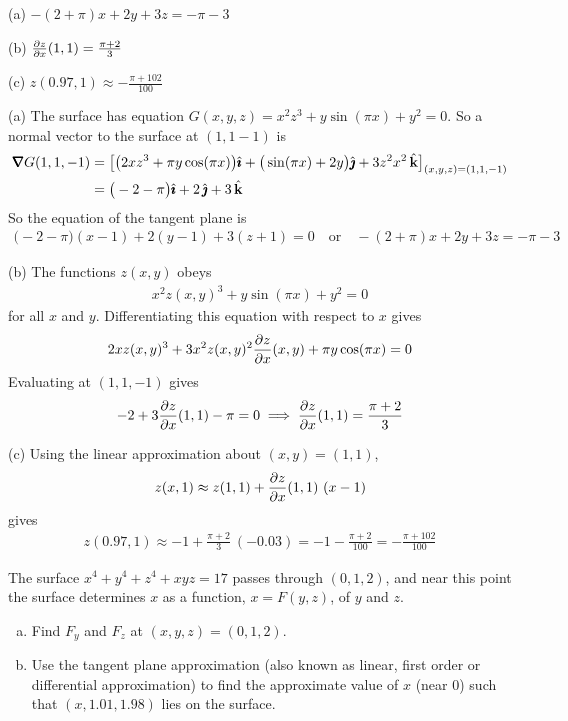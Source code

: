 %

\begin{answer}
(a)  $-(2+\pi)x +2y +3z = -\pi-3$

(b)  $\pdiff{z}{x}(1,1) = \frac{\pi+2}{3}$

(c)  $z(0.97,1) \approx -\frac{\pi+102}{100}$
\end{answer}

\begin{solution}
(a) The surface has equation $G(x,y,z) = x^2 z^3 + y \sin(\pi x) + y^2 =0$.
So a normal vector to the surface at $(1,1-1)$ is
\begin{align*}
\vnabla G(1,1,-1) 
&= \big[ \big(2x z^3 +\pi y\cos(\pi x)\big)\hi +\big(\sin(\pi x) +2y\big)\hj
           +3z^2 x^2\,\hk\big]_{(x,y,z)=(1,1,-1)} \\
&= \big(-2-\pi\big)\hi +2\,\hj +3\,\hk
\end{align*}
So the equation of the tangent plane is
\begin{align*}
\big(-2-\pi\big)(x-1) + 2(y-1) +3 (z+1) =0\quad\text{or}\quad
-(2+\pi)x +2y +3z = -\pi-3
\end{align*}


(b) The functions $z(x,y)$ obeys
\begin{align*}
x^2 z(x,y)^3 +y\sin(\pi x) +y^2 = 0
\end{align*}
for all $x$ and $y$. Differentiating this equation with respect to $x$ gives
\begin{align*}
2x z(x,y)^3 + 3 x^2 z(x,y)^2 \pdiff{z}{x}(x,y) + \pi y \cos(\pi x) =0
\end{align*}
Evaluating at $(1,1,-1)$ gives
\begin{align*}
-2 + 3 \pdiff{z}{x}(1,1) -\pi =0
\implies \pdiff{z}{x}(1,1) = \frac{\pi+2}{3}
\end{align*}

(c) Using the linear approximation about $(x,y)=(1,1)$,
\begin{align*}
z(x,1) \approx z(1,1) +\pdiff{z}{x}(1,1)\ (x-1)
\end{align*}
gives
\begin{align*}
z(0.97,1) \approx -1 +\frac{\pi+2}{3}\ (-0.03)
          = -1 -\frac{\pi+2}{100}
          =  -\frac{\pi+102}{100}
\end{align*}
\end{solution}

\begin{question} [M200 2001A] %
The surface $x^4+y^4+z^4+xyz=17$ passes through $(0,1,2)$,
and near this point the surface determines $x$ as a function, $x=F(y,z)$,
of $y$ and $z$.
\begin{enumerate}[(a)]
\item
Find $F_y$ and $F_z$ at $(x,y,z)=(0,1,2)$.

\item 
Use the tangent plane approximation (also known as linear,
first order or differential approximation) to find the approximate value
of $x$ (near $0$) such that $(x,1.01, 1.98)$ lies on the surface.
\end{enumerate}
\end{question}

